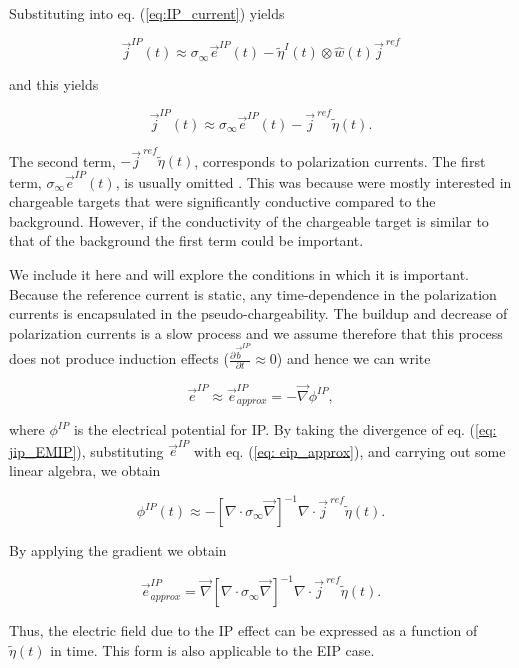 \documentclass[extra,mreferee]{gji}
\renewcommand{\div}{\nabla\cdot}
\newcommand{\grad}{\vec \nabla}
\newcommand{\siginf}{\sigma_\infty}
\renewcommand {\j}  { {\vec j} }
\renewcommand {\b}  { {\vec b} }
\newcommand {\e}  { {\vec e} }
\newcommand{\peta}{\tilde{\eta}}
\newcommand{\jref}{\j^{\ ref}}
\begin{document}
Substituting into eq. (\ref{eq:IP_current}) yields
\begin{linenomath*}
\begin{equation}
  \j^{IP}(t) \approx \siginf\e^{IP}(t) - \peta^{I}(t)\otimes \hat{w}(t)\jref
\end{equation}
\end{linenomath*}
and this yields
\begin{linenomath*}
\begin{equation}
  \j^{IP}(t) \approx \siginf\e^{IP}(t) -\jref\peta(t).
  \label{eq: jip_EMIP}
\end{equation}
\end{linenomath*}

The second term, $-\jref\peta(t)$, corresponds to polarization currents. The first term, $\siginf \e^{IP}(t)$, is usually omitted \cite[]{Smith1988a}. This was because \cite{Smith1988a} were mostly interested in chargeable targets that were significantly conductive compared to the background. However, if the conductivity of the chargeable target is similar to that of the background the first term could be important.

We include it here and will explore the conditions in which it is important.
Because the reference current is static, any time-dependence in the polarization currents is encapsulated in the pseudo-chargeability. The buildup and decrease of polarization currents is a slow process and we assume therefore that this process does not produce induction effects ($\frac{\partial \b^{IP}}{\partial t} \approx 0$) and hence we can write
\begin{linenomath*}
\begin{equation}
  \e^{IP} \approx  \e^{IP}_{approx} = -\grad\phi^{IP},
  \label{eq: eip_approx}
\end{equation}
\end{linenomath*}
where $\phi^{IP}$ is the electrical potential for IP.
By taking the divergence of  eq. (\ref{eq: jip_EMIP}), substituting  $\e^{IP}$ with eq. (\ref{eq: eip_approx}), and carrying out some linear algebra, we obtain
\begin{linenomath*}
\begin{equation}
  \phi^{IP}(t) \approx -[\div \siginf\grad]^{-1}\div\jref\peta(t).
  \label{eq: phiIPapprox_general}
\end{equation}
\end{linenomath*}
By applying the gradient we obtain
\begin{linenomath*}
\begin{equation}
    \e^{IP}_{approx} = \grad[\div \siginf\grad]^{-1}\div\jref\peta(t).
    \label{eq: eip_approx_full}
\end{equation}
\end{linenomath*}
Thus, the electric field due to the IP effect can be expressed as a function of $\peta(t)$ in time.
This form is also applicable to the  EIP case.
\end{document}
